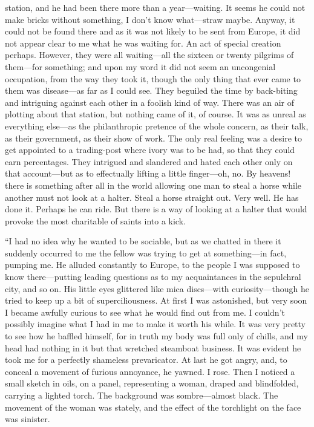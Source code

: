 \documentclass[12pt]{report}
\begin{document}
station, and he had been there more than a year---waiting. It seems he
could not make bricks without something, I don't know what---straw
maybe. Anyway, it could not be found there and as it was not likely to
be sent from Europe, it did not appear clear to me what he was waiting
for. An act of special creation perhaps. However, they were all
waiting---all the sixteen or twenty pilgrims of them---for something;
and upon my word it did not seem an uncongenial occupation, from the way
they took it, though the only thing that ever came to them was
disease---as far as I could see. They beguiled the time by back-biting
and intriguing against each other in a foolish kind of way. There was an
air of plotting about that station, but nothing came of it, of course.
It was as unreal as everything else---as the philanthropic pretence of
the whole concern, as their talk, as their government, as their show of
work. The only real feeling was a desire to get appointed to a
trading-post where ivory was to be had, so that they could earn
percentages. They intrigued and slandered and hated each other only on
that account---but as to effectually lifting a little finger---oh, no.
By heavens! there is something after all in the world allowing one man
to steal a horse while another must not look at a halter. Steal a horse
straight out. Very well. He has done it. Perhaps he can ride. But there
is a way of looking at a halter that would provoke the most charitable
of saints into a kick.

``I had no idea why he wanted to be sociable, but as we chatted in there
it suddenly occurred to me the fellow was trying to get at
something---in fact, pumping me. He alluded constantly to Europe, to the
people I was supposed to know there---putting leading questions as to my
acquaintances in the sepulchral city, and so on. His little eyes
glittered like mica discs---with curiosity---though he tried to keep up
a bit of superciliousness. At first I was astonished, but very soon I
became awfully curious to see what he would find out from me. I couldn't
possibly imagine what I had in me to make it worth his while. It was
very pretty to see how he baffled himself, for in truth my body was full
only of chills, and my head had nothing in it but that wretched
steamboat business. It was evident he took me for a perfectly shameless
prevaricator. At last he got angry, and, to conceal a movement of
furious annoyance, he yawned. I rose. Then I noticed a small sketch in
oils, on a panel, representing a woman, draped and blindfolded, carrying
a lighted torch. The background was sombre---almost black. The movement
of the woman was stately, and the effect of the torchlight on the face
was sinister.
\end{document}
